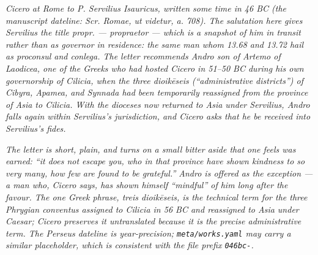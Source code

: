 
\textit{Cicero at Rome to P. Servilius Isauricus, written some time
in 46 BC (the manuscript dateline: \textit{Scr. Romae, ut videtur,
a. 708}). The salutation here gives Servilius the title
\textit{propr.} --- propraetor --- which is a snapshot of him in
transit rather than as governor in residence: the same man whom
13.68 and 13.72 hail as \textit{proconsul} and \textit{conlega}.
The letter recommends Andro son of Artemo of Laodicea, one of the
Greeks who had hosted Cicero in 51--50 BC during his own
governorship of Cilicia, when the three \textit{dioikēseis}
(``administrative districts'') of Cibyra, Apamea, and Synnada had
been temporarily reassigned from the province of Asia to Cilicia.
With the dioceses now returned to Asia under Servilius, Andro
falls again within Servilius's jurisdiction, and Cicero asks that
he be received into Servilius's \textit{fides}.}

\textit{The letter is short, plain, and turns on a small bitter
aside that one feels was earned: ``it does not escape you, who in
that province have shown kindness to so very many, how few are
found to be grateful.'' Andro is offered as the exception --- a man
who, Cicero says, has shown himself ``mindful'' of him long after
the favour. The one Greek phrase, \textit{treis dioikēseis}, is the
technical term for the three Phrygian conventus assigned to
Cilicia in 56 BC and reassigned to Asia under Caesar; Cicero
preserves it untranslated because it is the precise administrative
term. The Perseus dateline is year-precision; \texttt{meta/works.yaml}
may carry a similar placeholder, which is consistent with the
file prefix \texttt{046bc-}.}
